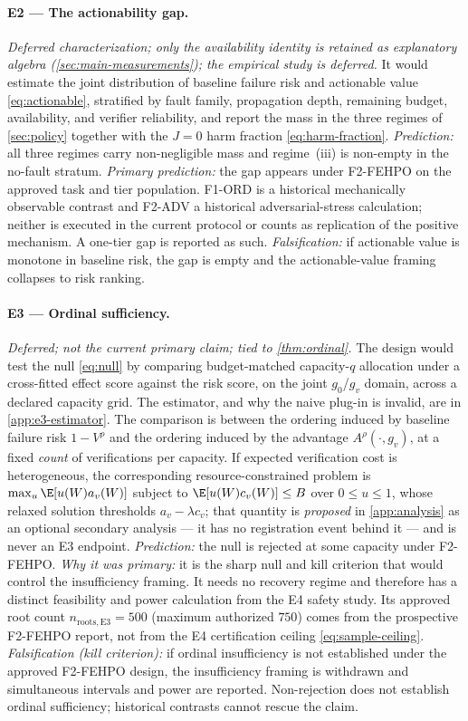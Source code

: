 \paragraph{E2 --- The actionability gap.}  \emph{Deferred characterization;
only the availability identity is retained as explanatory algebra
(\cref{sec:main-measurements}); the empirical study is deferred.}  It would
estimate the joint distribution of baseline
failure risk and actionable value \eqref{eq:actionable}, stratified by fault
family, propagation depth, remaining budget, availability, and verifier
reliability, and report the mass in the three regimes of \cref{sec:policy}
together with the $J=0$ harm fraction \eqref{eq:harm-fraction}.
\emph{Prediction:} all three regimes carry non-negligible mass and regime~(iii)
is non-empty in the no-fault stratum.  \emph{Primary prediction:} the gap
appears under F2-FEHPO on the approved task and tier population.  F1-ORD is a
historical mechanically observable contrast and F2-ADV a historical
adversarial-stress calculation; neither is executed in the current protocol or
counts as replication of the positive mechanism.  A one-tier gap is reported as such.
\emph{Falsification:} if actionable value is monotone in baseline
risk, the gap is empty and the actionable-value framing collapses to risk ranking.

\paragraph{E3 --- Ordinal sufficiency.}  \emph{Deferred; not the current
primary claim; tied to \cref{thm:ordinal}.}  The design would test the null
\eqref{eq:null} by comparing budget-matched
capacity-$q$ allocation under a cross-fitted effect score against the risk
score, on the joint $g_0$/$g_v$ domain, across a declared capacity grid.  The
estimator, and why the naive plug-in is invalid, are in \cref{app:e3-estimator}.
The comparison is between the ordering induced by baseline failure risk
$1-V^\rho$ and the ordering induced by the advantage $A^\rho(\cdot,g_v)$, at a
fixed \emph{count} of verifications per capacity.  If expected verification cost
is heterogeneous, the corresponding resource-constrained problem is
$\max_u\E[u(W)a_v(W)]$ subject to $\E[u(W)c_v(W)]\le B$ over $0\le u\le1$, whose
relaxed solution thresholds $a_v-\lambda c_v$; that quantity is \emph{proposed}
in \cref{app:analysis} as an optional secondary analysis --- it has no
registration event behind it --- and is never an E3 endpoint.
\emph{Prediction:} the null is rejected at some capacity under F2-FEHPO.
\emph{Why it was primary:} it is the sharp null and kill criterion that would
control the insufficiency framing.  It needs no recovery regime and therefore
has a distinct feasibility and power calculation from the E4 safety study.  Its approved
root count $n_{\mathrm{roots,E3}}=500$ (maximum authorized $750$) comes from the
prospective F2-FEHPO report, not from the E4
certification ceiling \eqref{eq:sample-ceiling}.
\emph{Falsification (kill criterion):} if ordinal insufficiency is not
established under the approved F2-FEHPO design, the insufficiency framing is
withdrawn and simultaneous intervals and power are reported.  Non-rejection
does not establish ordinal sufficiency; historical contrasts cannot rescue the claim.

